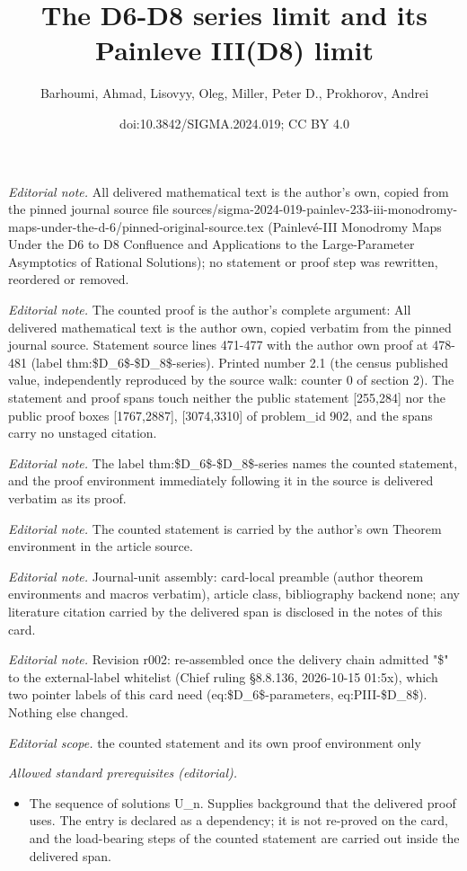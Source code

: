\documentclass[10pt,a4paper]{article}
\title{The D6-D8 series limit and its Painleve III(D8) limit}
\author{Barhoumi, Ahmad, Lisovyy, Oleg, Miller, Peter D., Prokhorov, Andrei}
\date{doi:10.3842/SIGMA.2024.019; CC BY 4.0}
\numberwithin{equation}{section}
\begin{document}
\maketitle
\setcounter{section}{2}
\setcounter{Theorem}{0}
\noindent\textit{Editorial note.} All delivered mathematical text is the author's own, copied from the pinned journal source file sources/sigma-2024-019-painlev-233-iii-monodromy-maps-under-the-d-6/pinned-original-source.tex (Painlevé-III Monodromy Maps Under the D6 to D8 Confluence and Applications to the Large-Parameter Asymptotics of Rational Solutions); no statement or proof step was rewritten, reordered or removed.\par\medskip
\noindent\textit{Editorial note.} The counted proof is the author's complete argument: All delivered mathematical text is the author own, copied verbatim from the pinned journal source. Statement source lines 471-477 with the author own proof at 478-481 (label thm:\$D\_6\$-\$D\_8\$-series). Printed number 2.1 (the census published value, independently reproduced by the source walk: counter 0 of section 2). The statement and proof spans touch neither the public statement [255,284] nor the public proof boxes [1767,2887], [3074,3310] of problem\_id 902, and the spans carry no unstaged citation.\par\medskip
\noindent\textit{Editorial note.} The label thm:\$D\_6\$-\$D\_8\$-series names the counted statement, and the proof environment immediately following it in the source is delivered verbatim as its proof.\par\medskip
\noindent\textit{Editorial note.} The counted statement is carried by the author's own Theorem environment in the article source.\par\medskip
\noindent\textit{Editorial note.} Journal-unit assembly: card-local preamble (author theorem environments and macros verbatim), article class, bibliography backend none; any literature citation carried by the delivered span is disclosed in the notes of this card.\par\medskip
\noindent\textit{Editorial note.} Revision r002: re-assembled once the delivery chain admitted "\$" to the external-label whitelist (Chief ruling §8.8.136, 2026-10-15 01:5x), which two pointer labels of this card need (eq:\$D\_6\$-parameters, eq:PIII-\$D\_8\$). Nothing else changed.\par\medskip
\noindent\textit{Editorial scope.} the counted statement and its own proof environment only\par\medskip
\noindent\textit{Allowed standard prerequisites (editorial).}\begin{itemize}
\item The sequence of solutions U\_n. Supplies background that the delivered proof uses. The entry is declared as a dependency; it is not re-proved on the card, and the load-bearing steps of the counted statement are carried out inside the delivered span.
\end{itemize}\medskip
\end{document}
